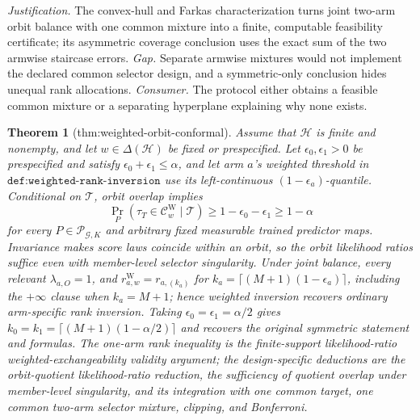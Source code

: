 \documentclass{article}
\newtheorem{theorem}{Theorem}
\begin{document}
\par\smallskip\noindent \textit{Justification.} The convex-hull and Farkas characterization turns joint two-arm orbit balance with one common mixture into a finite, computable feasibility certificate; its asymmetric coverage conclusion uses the exact sum of the two armwise staircase errors. \textit{Gap.} Separate armwise mixtures would not implement the declared common selector design, and a symmetric-only conclusion hides unequal rank allocations. \textit{Consumer.} The protocol either obtains a feasible common mixture or a separating hyperplane explaining why none exists.

\begin{theorem}[thm:weighted-orbit-conformal]\label{thm:weighted-orbit-conformal}
Assume that \(\mathcal H\) is finite and nonempty, and let \(w\in\Delta(\mathcal H)\) be fixed or prespecified. Let \(\epsilon_0,\epsilon_1>0\) be prespecified and satisfy \(\epsilon_0+\epsilon_1\le\alpha\), and let arm \(a\)'s weighted threshold in \(\texttt{def:weighted-rank-inversion}\) use its left-continuous \((1-\epsilon_a)\)-quantile. Conditional on \(\mathcal T\), orbit overlap implies \[\Pr_P(\tau_T\in\mathcal C^{\mathrm W}_w\mid\mathcal T)\ge1-\epsilon_0-\epsilon_1\ge1-\alpha\] for every \(P\in\mathcal P_{\mathcal G,K}\) and arbitrary fixed measurable trained predictor maps. Invariance makes score laws coincide within an orbit, so the orbit likelihood ratios suffice even with member-level selector singularity. Under joint balance, every relevant \(\lambda_{a,O}=1\), and \(r^{\mathrm W}_{a,w}=r_{a,(k_a)}\) for \(k_a=\lceil(M+1)(1-\epsilon_a)\rceil\), including the \(+\infty\) clause when \(k_a=M+1\); hence weighted inversion recovers ordinary arm-specific rank inversion. Taking \(\epsilon_0=\epsilon_1=\alpha/2\) gives \(k_0=k_1=\lceil(M+1)(1-\alpha/2)\rceil\) and recovers the original symmetric statement and formulas. The one-arm rank inequality is the finite-support likelihood-ratio weighted-exchangeability validity argument; the design-specific deductions are the orbit-quotient likelihood-ratio reduction, the sufficiency of quotient overlap under member-level singularity, and its integration with one common target, one common two-arm selector mixture, clipping, and Bonferroni.
\end{theorem}
\end{document}
